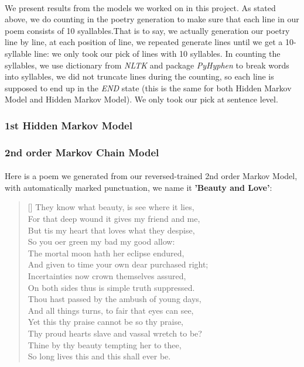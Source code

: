 %
\paragraph{}\label{sec:syllablecount}
We present results from the models we worked on in this project. As stated above, we do counting in the poetry generation to make sure that each line in our poem consists of 10 syallables.That is to say, we actually generation our poetry line by line, at each position of line, we repeated generate lines until we get a 10-syllable line: we only took our pick of lines with 10 syllables. In counting the syllables, we use dictionary from \textit{NLTK} and package \textit{PyHyphen} to break words into syllables, we did not truncate lines during the counting, so each line is supposed to end up in the \textit{END} state (this is the same for both Hidden Markov Model and Hidden Markov Model). We only took our pick at sentence level.
\subsubsection{1st Hidden Markov Model}

\subsubsection{2nd order Markov Chain Model}
\paragraph{}
Here is a poem we generated from our reversed-trained 2nd order Markov Model, with automatically marked punctuation, we name it \textbf{'Beauty and Love'}:
\renewcommand{\poemtoc}{subsection}
\settowidth{\versewidth}{Thy proud hearts slave and vassal wretch to be?}
\begin{verse}[\versewidth]
They know what beauty, is see where it lies,\\
For that deep wound it gives my friend and me,\\
But tis my heart that loves what they despise,\\
So you oer green my bad my good allow:\\
The mortal moon hath her eclipse endured,\\
And given to time your own dear purchased right;\\
Incertainties now crown themselves assured,\\
On both sides thus is simple truth suppressed.\\
Thou hast passed by the ambush of young days,\\
And all things turns, to fair that eyes can see,\\
Yet this thy praise cannot be so thy praise,\\
Thy proud hearts slave and vassal wretch to be?\\
\vin Thine by thy beauty tempting her to thee,\\
\vin  So long lives this and this shall ever be.\\
\end{verse}